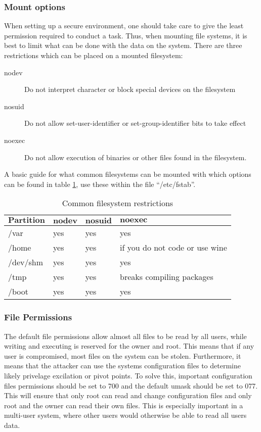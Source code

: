 \documentclass[a4paper,11pt]{report}
\begin{document}
		\subsubsection{Mount options}
			When setting up a secure environment, one should take care to give the least permission required to conduct a task. 
			Thus, when mounting file systems, it is best to limit what can be done with the data on the system.
			There are three restrictions which can be placed on a mounted filesystem:
			\begin{description}
				\item[nodev] Do not interpret character or block special devices on the filesystem
				\item[nosuid] Do not allow set-user-identifier or set-group-identifier bits to take effect
				\item[noexec] Do not allow execution of binaries or other files found in the filesystem. 
			\end{description}
			A basic guide for what common filesystems can be mounted with which options can be found in table \ref{tab:mountOptions}, use these within the file ``/etc/fstab''.
			\begin{table}[htb]
				\centering
				\begin{tabular}{| l | l | l | l |}
					\hline
					$\textbf{Partition}$ & $\textbf{nodev}$ & $\textbf{nosuid}$ & $\textbf{noexec}$ \\ \hline
					/var  &		yes &	yes &	yes \\ \hline
					/home &		yes &	yes &	if you do not code or use wine \\ \hline
					/dev/shm &	yes &	yes &	yes \\ \hline
					/tmp &		yes &	yes &	breaks compiling packages \\ \hline
					/boot &		yes &	yes &	yes \\ \hline
				\end{tabular}
				\caption{Common filesystem restrictions}
				\label{tab:mountOptions}
			\end{table}
			\subsubsection{File Permissions}
				The default file permissions allow almost all files to be read by all users, while writing and executing is reserved for the owner and root. 
				This means that if any user is compromised, most files on the system can be stolen. 
				Furthermore, it means that the attacker can use the systems configuration files to determine likely privelage excilation or pivot points. 
				To solve this, important configuration files permissions should be set to 700 and the default umask should be set to 077. 
				This will ensure that only root can read and change configuration files and only root and the owner can read their own files. 
				This is especially important in a multi-user system, where other users would otherwise be able to read all users data. 
\end{document}
